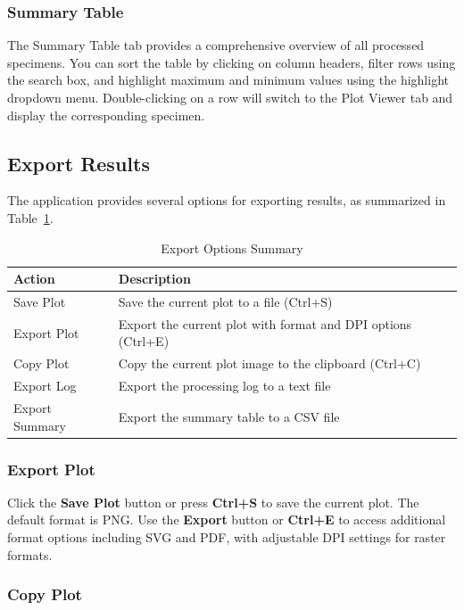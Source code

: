 \documentclass[11pt,a4paper]{article}
\begin{document}
\subsubsection{Summary Table}

The Summary Table tab provides a comprehensive overview of all processed specimens. You can sort the table by clicking on column headers, filter rows using the search box, and highlight maximum and minimum values using the highlight dropdown menu. Double-clicking on a row will switch to the Plot Viewer tab and display the corresponding specimen.

\subsection{Export Results}

The application provides several options for exporting results, as summarized in Table~\ref{tab:export_options}.

\begin{table}[h]
\centering
\caption{Export Options Summary}\label{tab:export_options}
\begin{tabular}{p{4cm}p{10cm}}
\toprule
\textbf{Action} & \textbf{Description} \\
\midrule
Save Plot & Save the current plot to a file (Ctrl+S) \\
Export Plot & Export the current plot with format and DPI options (Ctrl+E) \\
Copy Plot & Copy the current plot image to the clipboard (Ctrl+C) \\
Export Log & Export the processing log to a text file \\
Export Summary & Export the summary table to a CSV file \\
\bottomrule
\end{tabular}
\end{table}

\subsubsection{Export Plot}

Click the \textbf{Save Plot} button or press \textbf{Ctrl+S} to save the current plot. The default format is PNG. Use the \textbf{Export} button or \textbf{Ctrl+E} to access additional format options including SVG and PDF, with adjustable DPI settings for raster formats.

\subsubsection{Copy Plot}
\end{document}
